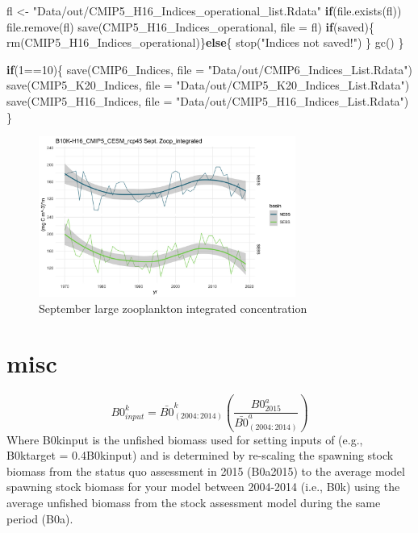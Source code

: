 \documentclass[
]{article}
\newenvironment{Shaded}{\begin{snugshade}}{\end{snugshade}}
\newcommand{\AttributeTok}[1]{\textcolor[rgb]{0.77,0.63,0.00}{#1}}
\newcommand{\ControlFlowTok}[1]{\textcolor[rgb]{0.13,0.29,0.53}{\textbf{#1}}}
\newcommand{\DecValTok}[1]{\textcolor[rgb]{0.00,0.00,0.81}{#1}}
\newcommand{\FunctionTok}[1]{\textcolor[rgb]{0.00,0.00,0.00}{#1}}
\newcommand{\NormalTok}[1]{#1}
\newcommand{\OtherTok}[1]{\textcolor[rgb]{0.56,0.35,0.01}{#1}}
\newcommand{\SpecialCharTok}[1]{\textcolor[rgb]{0.00,0.00,0.00}{#1}}
\newcommand{\StringTok}[1]{\textcolor[rgb]{0.31,0.60,0.02}{#1}}
\begin{document}
\begin{Shaded}
\begin{Highlighting}[]
\NormalTok{      fl }\OtherTok{\textless{}{-}} \StringTok{"Data/out/CMIP5\_H16\_Indices\_operational\_list.Rdata"}
      \ControlFlowTok{if}\NormalTok{(}\FunctionTok{file.exists}\NormalTok{(fl)) }\FunctionTok{file.remove}\NormalTok{(fl)}
      \FunctionTok{save}\NormalTok{(CMIP5\_H16\_Indices\_operational, }\AttributeTok{file =}\NormalTok{ fl)}
      \ControlFlowTok{if}\NormalTok{(saved)\{}
        \FunctionTok{rm}\NormalTok{(CMIP5\_H16\_Indices\_operational)\}}\ControlFlowTok{else}\NormalTok{\{}
          \FunctionTok{stop}\NormalTok{(}\StringTok{"Indices not saved!"}\NormalTok{)}
\NormalTok{        \}}
      \FunctionTok{gc}\NormalTok{()}
\NormalTok{    \}}
    
    \ControlFlowTok{if}\NormalTok{(}\DecValTok{1}\SpecialCharTok{==}\DecValTok{10}\NormalTok{)\{}
      \FunctionTok{save}\NormalTok{(CMIP6\_Indices, }\AttributeTok{file =} \StringTok{"Data/out/CMIP6\_Indices\_List.Rdata"}\NormalTok{)}
      \FunctionTok{save}\NormalTok{(CMIP5\_K20\_Indices, }\AttributeTok{file =} \StringTok{"Data/out/CMIP5\_K20\_Indices\_List.Rdata"}\NormalTok{)}
      \FunctionTok{save}\NormalTok{(CMIP5\_H16\_Indices, }\AttributeTok{file =} \StringTok{"Data/out/CMIP5\_H16\_Indices\_List.Rdata"}\NormalTok{)}
\NormalTok{    \}}
\end{Highlighting}
\end{Shaded}

\begin{figure}
\centering
\includegraphics[width=0.75\textwidth,height=\textheight]{Figs/Hind_Sept_large_Zoop.jpg}
\caption{September large zooplankton integrated concentration}
\end{figure}

\hypertarget{misc}{%
\section{misc}\label{misc}}

\[B0^k_{input}= \bar{B0}^k_{(2004:2014)}\left(\frac{B0^{a}_{2015}}{\bar{B0}^a_{(2004:2014)}}\right) \]
Where B0kinput is the unfished biomass used for setting inputs of (e.g.,
B0ktarget = 0.4B0kinput) and is determined by re-scaling the spawning
stock biomass from the status quo assessment in 2015 (B0a2015) to the
average model spawning stock biomass for your model between 2004-2014
(i.e., B0k) using the average unfished biomass from the stock assessment
model during the same period (B0a).
\end{document}
